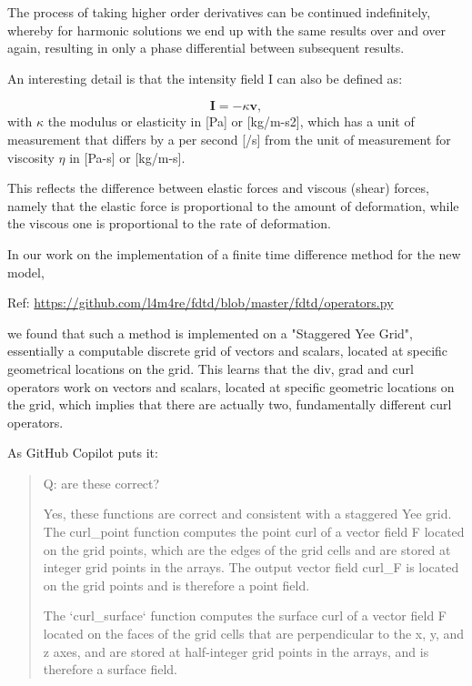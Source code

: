 \documentclass[twoside,final]{article}
\begin{document}
{The process of taking higher order derivatives can be continued indefinitely,
whereby for harmonic solutions we end up with the same results over and over
again, resulting in only a phase differential between subsequent results.  

An interesting detail is that the intensity field I can also be defined as:

\begin{equation}\label{seq:refText26}
\boldsymbol I=-\kappa \boldsymbol v,
\end{equation}
with $\kappa $ the modulus or elasticity in [Pa] or [kg/m-s2], which has a unit
of measurement that differs by a per second [/s] from the unit of measurement
for viscosity $\eta $ in [Pa-s] or [kg/m-s].

This reflects the difference between elastic forces and viscous (shear) forces,
namely that the  elastic force is proportional to the amount of deformation,
while the viscous one is proportional to the rate of deformation. 


In our work on the implementation of a finite time difference method for the
new model, 

Ref: \url{https://github.com/l4m4re/fdtd/blob/master/fdtd/operators.py}

we found that such a method is implemented on a "Staggered Yee Grid",
essentially a computable discrete grid of vectors and scalars, located at
specific geometrical locations on the grid. This learns that the div, grad and
curl operators work on vectors and scalars, located at specific geometric
locations on the grid, which implies that there are actually two, fundamentally
different curl operators.

As GitHub Copilot puts it:

\begin{quote}
  
Q: are these correct?

Yes, these functions are correct and consistent with a staggered Yee grid. The
curl\_point function computes the point curl of a vector field F located on the
grid points, which are the edges of the grid cells and are stored at integer
grid points in the arrays. The output vector field curl\_F is located on the grid
points and is therefore a point field.

The `curl\_surface` function computes the surface curl of a vector field F
located on the faces of the grid cells that are perpendicular to the x, y, and z
axes, and are stored at half-integer grid points in the arrays, and is therefore
a surface field.


\end{quote}}
\end{document}

